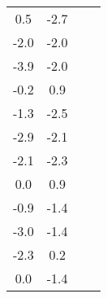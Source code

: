 \begin{longtable}{cccc}
    0.5                                    & -2.7                            \\
    -2.0                                   & -2.0                            \\
    -3.9                                   & -2.0                            \\
    -0.2                                   & 0.9                             \\
    -1.3                                   & -2.5                            \\
    -2.9                                   & -2.1                            \\
    -2.1                                   & -2.3                            \\
    0.0                                    & 0.9                             \\
    -0.9                                   & -1.4                            \\
    -3.0                                   & -1.4                            \\
    -2.3                                   & 0.2                             \\
    0.0                                    & -1.4                            \\
\end{longtable}
